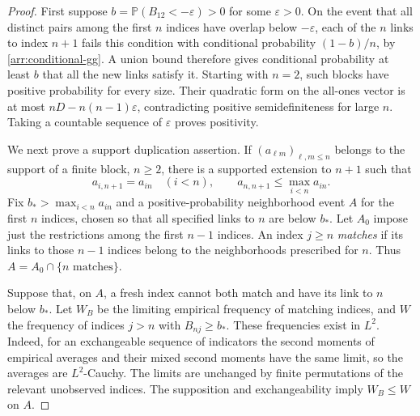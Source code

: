 \begin{proof}
First suppose $b=\mathbb P(B_{12}<-\varepsilon)>0$ for some
$\varepsilon>0$.  On the event that all distinct pairs among the first
$n$ indices have overlap below $-\varepsilon$, each of the $n$ links to
index $n+1$ fails this condition with conditional probability
$(1-b)/n$, by \eqref{arr:conditional-gg}.  A union bound therefore gives
conditional probability at least $b$ that all the new links satisfy it.
Starting with $n=2$, such blocks have positive probability for every size.
Their quadratic form on the all-ones vector is at most
$nD-n(n-1)\varepsilon$, contradicting positive semidefiniteness for large
$n$.  Taking a countable sequence of $\varepsilon$ proves positivity.

We next prove a support duplication assertion.  If
$(a_{\ell m})_{\ell,m\leq n}$ belongs to the support of a finite block,
$n\geq2$, there is a supported extension to $n+1$ such that
\begin{equation}
 a_{i,n+1}=a_{in}\quad(i<n),\qquad
 a_{n,n+1}\leq\max_{i<n}a_{in}.
 \label{arr:duplication}
\end{equation}
Fix $b_*>\max_{i<n}a_{in}$ and a positive-probability neighborhood event
$A$ for the first $n$ indices, chosen so that all specified links to $n$
are below $b_*$.  Let $A_0$ impose just the restrictions among the first
$n-1$ indices.  An index $j\geq n$ \emph{matches} if its links to those
$n-1$ indices belong to the neighborhoods prescribed for $n$.  Thus
$A=A_0\cap\{n\text{ matches}\}$.

Suppose that, on $A$, a fresh index cannot both match and have its link to
$n$ below $b_*$.  Let $W_B$ be the limiting empirical frequency of
matching indices, and $W$ the frequency of indices $j>n$ with
$B_{nj}\geq b_*$.  These frequencies exist in $L^2$.  Indeed, for an
exchangeable sequence of indicators the second moments of empirical
averages and their mixed second moments have the same limit, so the
averages are $L^2$-Cauchy.  The limits are unchanged by finite
permutations of the relevant unobserved indices.  The supposition and
exchangeability imply $W_B\leq W$ on $A$.


\end{proof}
